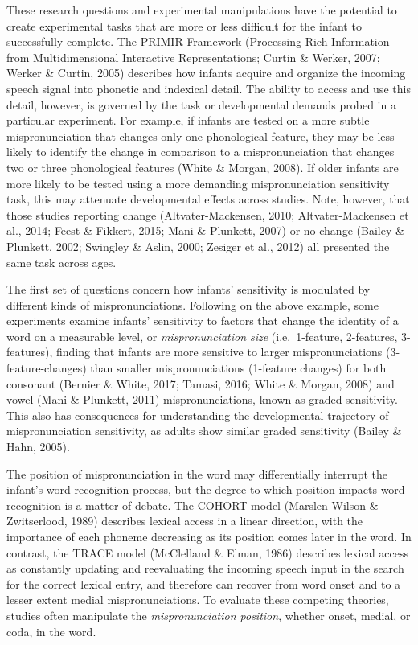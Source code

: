 \documentclass[
  man, noextraspace]{apa6}
\begin{document}
These research questions and experimental manipulations have the potential to create experimental tasks that are more or less difficult for the infant to successfully complete. The PRIMIR Framework (Processing Rich Information from Multidimensional Interactive Representations; Curtin \& Werker, 2007; Werker \& Curtin, 2005) describes how infants acquire and organize the incoming speech signal into phonetic and indexical detail. The ability to access and use this detail, however, is governed by the task or developmental demands probed in a particular experiment. For example, if infants are tested on a more subtle mispronunciation that changes only one phonological feature, they may be less likely to identify the change in comparison to a mispronunciation that changes two or three phonological features (White \& Morgan, 2008). If older infants are more likely to be tested using a more demanding mispronunciation sensitivity task, this may attenuate developmental effects across studies. Note, however, that those studies reporting change (Altvater-Mackensen, 2010; Altvater-Mackensen et al., 2014; Feest \& Fikkert, 2015; Mani \& Plunkett, 2007) or no change (Bailey \& Plunkett, 2002; Swingley \& Aslin, 2000; Zesiger et al., 2012) all presented the same task across ages.

The first set of questions concern how infants' sensitivity is modulated by different kinds of mispronunciations. Following on the above example, some experiments examine infants' sensitivity to factors that change the identity of a word on a measurable level, or \emph{mispronunciation size} (i.e.~1-feature, 2-features, 3-features), finding that infants are more sensitive to larger mispronunciations (3-feature-changes) than smaller mispronunciations (1-feature changes) for both consonant (Bernier \& White, 2017; Tamasi, 2016; White \& Morgan, 2008) and vowel (Mani \& Plunkett, 2011) mispronunciations, known as graded sensitivity. This also has consequences for understanding the developmental trajectory of mispronunciation sensitivity, as adults show similar graded sensitivity (Bailey \& Hahn, 2005).

The position of mispronunciation in the word may differentially interrupt the infant's word recognition process, but the degree to which position impacts word recognition is a matter of debate. The COHORT model (Marslen-Wilson \& Zwitserlood, 1989) describes lexical access in a linear direction, with the importance of each phoneme decreasing as its position comes later in the word. In contrast, the TRACE model (McClelland \& Elman, 1986) describes lexical access as constantly updating and reevaluating the incoming speech input in the search for the correct lexical entry, and therefore can recover from word onset and to a lesser extent medial mispronunciations. To evaluate these competing theories, studies often manipulate the \emph{mispronunciation position}, whether onset, medial, or coda, in the word.
\end{document}
